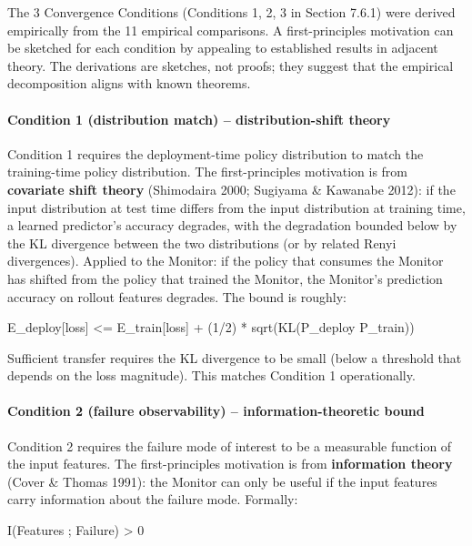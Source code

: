 \documentclass[11pt]{article}
\begin{document}
The 3 Convergence Conditions (Conditions 1, 2, 3 in Section 7.6.1) were
derived empirically from the 11 empirical comparisons. A
first-principles motivation can be sketched for each condition by
appealing to established results in adjacent theory. The derivations are
sketches, not proofs; they suggest that the empirical decomposition
aligns with known theorems.

\paragraph{Condition 1 (distribution match) -- distribution-shift
theory}\label{condition-1-distribution-match-distribution-shift-theory}

Condition 1 requires the deployment-time policy distribution to match
the training-time policy distribution. The first-principles motivation
is from \textbf{covariate shift theory} (Shimodaira 2000; Sugiyama \&
Kawanabe 2012): if the input distribution at test time differs from the
input distribution at training time, a learned predictor's accuracy
degrades, with the degradation bounded below by the KL divergence
between the two distributions (or by related R\textquotesingle enyi
divergences). Applied to the Monitor: if the policy that consumes the
Monitor has shifted from the policy that trained the Monitor, the
Monitor's prediction accuracy on rollout features degrades. The bound is
roughly:

E\_deploy{[}loss{]} \textless= E\_train{[}loss{]} + (1/2) *
sqrt(KL(P\_deploy \textbar\textbar{} P\_train))

Sufficient transfer requires the KL divergence to be small (below a
threshold that depends on the loss magnitude). This matches Condition 1
operationally.

\paragraph{Condition 2 (failure observability) -- information-theoretic
bound}\label{condition-2-failure-observability-information-theoretic-bound}

Condition 2 requires the failure mode of interest to be a measurable
function of the input features. The first-principles motivation is from
\textbf{information theory} (Cover \& Thomas 1991): the Monitor can only
be useful if the input features carry information about the failure
mode. Formally:

I(Features ; Failure) \textgreater{} 0
\end{document}
